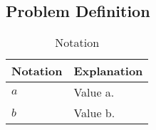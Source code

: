
\subsection{Problem Definition}

\begin{table}[tb]
\centering\scriptsize
\caption{Notation}
\begin{tabular}{ll}
    \hline %
    Notation & Explanation \\
    \hline %
	      $a$  & Value a.\\
	      $b$ & Value b.\\
    \hline %
\end{tabular}
\label{table:notation}
\end{table}
